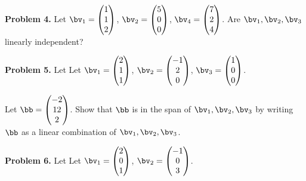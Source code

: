 \documentclass[oneside,12pt]{amsart}
\begin{document}
\bigskip
\bigskip
\bigskip
\bigskip
\bigskip
\bigskip
\bigskip
\bigskip
\bigskip
\bigskip

\textbf{Problem 4.} Let
$\bv_1 =
\begin{pmatrix}
1 \\
1 \\
2 \\
\end{pmatrix}
$,
$\bv_2 =
\begin{pmatrix}
5 \\
0 \\
0 \\
\end{pmatrix}
$,
$\bv_4 =
\begin{pmatrix}
7 \\
2 \\
4 \\
\end{pmatrix}
$.
Are $\bv_1,\bv_2,\bv_3$ linearly independent?

\bigskip
\bigskip
\bigskip
\bigskip
\bigskip
\bigskip
\bigskip
\bigskip
\bigskip
\bigskip

\textbf{Problem 5.} Let
Let $\bv_1 =
\begin{pmatrix}
2 \\
1 \\
1 \\
\end{pmatrix}
$,
$\bv_2 =
\begin{pmatrix}
-1 \\
2 \\
0 \\
\end{pmatrix}
$,
$\bv_3 =
\begin{pmatrix}
1 \\
0 \\
0 \\
\end{pmatrix}
$.

Let $\bb=
\begin{pmatrix}
-2 \\
12 \\
2 \\
\end{pmatrix}
$.
Show that $\bb$ is in the span of $\bv_1,\bv_2,\bv_3$ by writing $\bb$ as
a linear combination of $\bv_1,\bv_2,\bv_3$.

\bigskip
\bigskip
\bigskip
\bigskip
\bigskip
\bigskip
\bigskip
\bigskip
\bigskip
\bigskip

\textbf{Problem 6.} Let
Let $\bv_1 =
\begin{pmatrix}
2 \\
0 \\
1 \\
\end{pmatrix}
$,
$\bv_2 =
\begin{pmatrix}
-1 \\
0 \\
3 \\
\end{pmatrix}
$.
\end{document}

